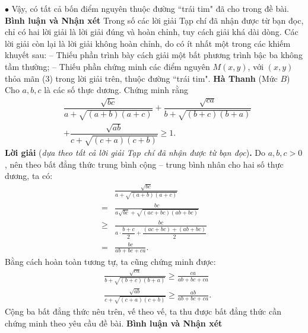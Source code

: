 \begin{multicols}{2}
	\vskip 0.05cm
	$\bullet$ Vậy, có tất cả bốn điểm nguyên thuộc đường ``trái tim" đã cho trong đề bài.
	\vskip 0.05cm
	\textbf{\color{thachthuctoanhoc}Bình luận và Nhận xét}
	\vskip 0.05cm
	Trong số các lời giải Tạp chí đã nhận được từ bạn đọc, chỉ có hai lời giải là lời giải đúng và hoàn chỉnh, tuy cách giải khá dài dòng. Các lời giải còn lại là lời giải không hoàn chỉnh, do có ít nhất một trong các khiếm khuyết sau:
	\vskip 0.05cm
	-- Thiếu phần trình bày cách giải một bất phương trình bậc ba không tầm thường;
	\vskip 0.05cm
	-- Thiếu phần chứng minh các điểm nguyên $M(x, y)$, với $(x, y)$ thỏa mãn ($3$) trong lời giải trên, thuộc đường ``trái tim".
	\vskip 0.1cm
	\hfill	\textbf{\color{thachthuctoanhoc}Hà Thanh}
	\vskip 0.1cm
	{}
	(Mức $B$) Cho $a,b,c$ là các số thực dương. Chứng minh rằng
	\begin{align*}
		&\dfrac{\sqrt{b c}}{a\!+\!\sqrt{(a\!+\!b)(a\!+\!c)}}+\dfrac{\sqrt{c a}}{b+\sqrt{(b+c)(b+a)}}\\
		&+\dfrac{\sqrt{a b}}{c+\sqrt{(c+a)(c+b)}} \geq 1.
	\end{align*}
	\textbf{\color{thachthuctoanhoc}Lời giải} (\textit{dựa theo tất cả lời giải Tạp chí đã nhận được từ bạn đọc})\textbf{\color{thachthuctoanhoc}.}
	\vskip 0.05cm
	Do $a, b, c > 0$, nên theo bất đẳng thức trung bình cộng -- trung bình nhân cho hai số thực dương, ta có:
	\begin{align*}
		&\frac{{\sqrt {bc} }}{{a + \sqrt {\left( {a + b} \right)\left( {a + c} \right)} }} \\[-0.5ex]
		= &\frac{{bc}}{{a\sqrt {bc}  + \sqrt {\left( {ac + bc} \right)\left( {ab + bc} \right)} }}\\[-0.5ex]
		\ge &\frac{{bc}}{{a \cdot \dfrac{{b + c}}{2} + \dfrac{{\left( {ac + bc} \right) + \left( {ab + bc} \right)}}{2}}}\\[-0.5ex]
		= &\frac{{bc}}{{ab + bc + ca}}.
	\end{align*}
	Bằng cách hoàn toàn tương tự, ta cũng chứng minh được:
	\begin{align*}
		&\frac{{\sqrt {ca} }}{{b + \sqrt {\left( {b + c} \right)\left( {b + a} \right)} }} \ge \frac{{ca}}{{ab + bc + ca}}\\[-0.5ex]
		&\frac{{\sqrt {ab} }}{{c + \sqrt {\left( {c + a} \right)\left( {c + b} \right)} }} \ge \frac{{ab}}{{ab + bc + ca}}.
	\end{align*}
	Cộng ba bất đẳng thức nêu trên, vế theo vế, ta thu được bất đẳng thức cần chứng minh theo yêu cầu đề bài.
	\vskip 0.05cm
	\textbf{\color{thachthuctoanhoc}Bình luận và Nhận xét}

\end{multicols}
